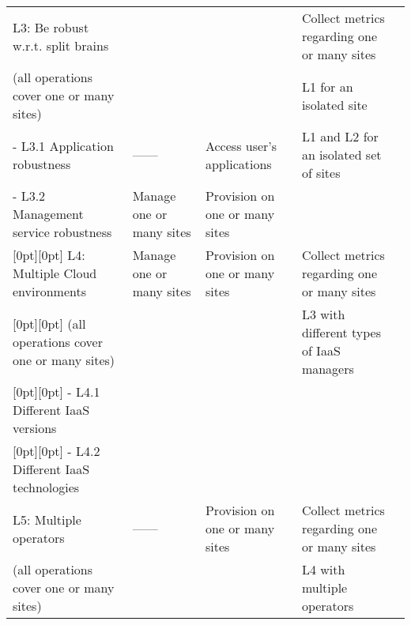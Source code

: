 \begin{tabular}{@{} l L L L @{} >{\kern\tabcolsep}l @{}}
    L3: Be robust w.r.t. split brains &
    &
    &
    Collect metrics regarding one or many sites\\ 

    (all operations cover one or many sites) &
    &
    &
    L1 for an isolated site \\

    - L3.1 Application robustness&
    \hfill ------ \hfill &
    Access user's applications&
    L1 and L2 for an isolated set of sites \\

    - L3.2 Management service robustness&
    Manage one or many sites &
    Provision on one or many sites&
    \\

    [0pt][0pt]
    L4: Multiple Cloud environments &
    Manage one or many sites &
    Provision on one or many sites&
    Collect metrics regarding one or many sites\\ 

    [0pt][0pt]
    (all operations cover one or many sites) &
    &
    &
    L3 with different types of IaaS managers  \\

    [0pt][0pt]
    - L4.1 Different IaaS versions&
    &
    &
    \\
    
    [0pt][0pt]
    - L4.2 Different IaaS technologies&
    &
    &
    \\

    L5: Multiple operators &
    \hfill ------ \hfill &
    Provision on one or many sites&
    Collect metrics regarding one or many sites\\ 

    (all operations cover one or many sites) &
    &
    &
    L4 with multiple operators \\
    \bottomrule

  \end{tabular}

